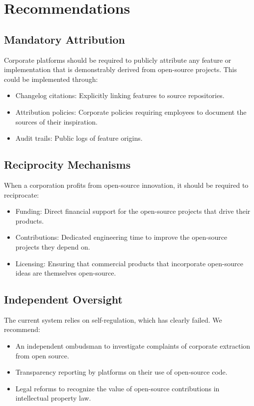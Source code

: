 \documentclass[12pt]{article}
\begin{document}
\section{Recommendations}

\subsection{Mandatory Attribution}
Corporate platforms should be required to publicly attribute any feature or implementation that is demonstrably derived from open-source projects. This could be implemented through:
\begin{itemize}
\item Changelog citations: Explicitly linking features to source repositories.
\item Attribution policies: Corporate policies requiring employees to document the sources of their inspiration.
\item Audit trails: Public logs of feature origins.
\end{itemize}

\subsection{Reciprocity Mechanisms}
When a corporation profits from open-source innovation, it should be required to reciprocate:
\begin{itemize}
\item Funding: Direct financial support for the open-source projects that drive their products.
\item Contributions: Dedicated engineering time to improve the open-source projects they depend on.
\item Licensing: Ensuring that commercial products that incorporate open-source ideas are themselves open-source.
\end{itemize}

\subsection{Independent Oversight}
The current system relies on self-regulation, which has clearly failed. We recommend:
\begin{itemize}
\item An independent ombudsman to investigate complaints of corporate extraction from open source.
\item Transparency reporting by platforms on their use of open-source code.
\item Legal reforms to recognize the value of open-source contributions in intellectual property law.
\end{itemize}
\end{document}

